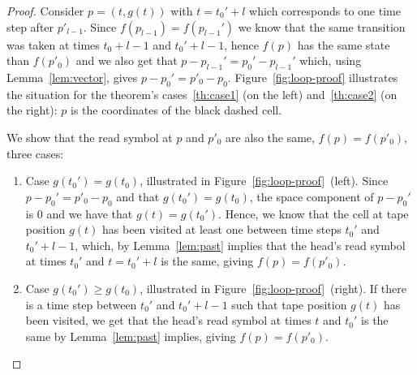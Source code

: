 \begin{proof}



    Consider $p = (t, g(t))$ with $t=t_0'+l$ which corresponds to one time step after $p'_{l-1}$. Since $f(p_{l-1}) = f(p_{l-1}')$ we know that the same transition was taken at times $t_0+l-1$ and $t_0'+l-1$, hence $f(p)$ has the same state than $f(p'_0)$ and we also get that $p-p_{l-1}' = p_0' - p_{l-1}'$ which, using Lemma~\ref{lem:vector}, gives $p-p_0' = p'_0 - p_0$. Figure~\ref{fig:loop-proof} illustrates the situation for the theorem's cases~\ref{th:case1} (on the left) and~\ref{th:case2} (on the right): $p$ is the coordinates of the black dashed cell.

    We show that the read symbol at $p$ and $p'_0$ are also the same, \ie $f(p) = f(p'_0)$, three cases:

    \begin{enumerate}
        \item Case $g(t_0') = g(t_0)$, illustrated in Figure~\ref{fig:loop-proof}~(left). Since $p-p_0' = p'_0 - p_0$ and that $g(t_0') = g(t_0)$, the space component of $p-p_0'$ is 0 and we have that $g(t) = g(t_0')$. Hence, we know that the cell at tape position $g(t)$ has been visited at least one between time steps $t_0'$ and $t_0'+l-1$, which, by Lemma~\ref{lem:past} implies that the head's read symbol at times $t_0'$ and $t = t_0'+l$ is the same, giving $f(p) = f(p'_0)$.

        \item Case $g(t_0') \geq g(t_0)$, illustrated in Figure~\ref{fig:loop-proof}~(right). If there is a time step between $t_0'$ and $t_0'+l-1$ such that tape position $g(t)$ has been visited, we get that the head's read symbol at times $t$ and $t_0'$ is the same by Lemma~\ref{lem:past} implies, giving $f(p) = f(p'_0)$.


\end{enumerate}
\end{proof}
